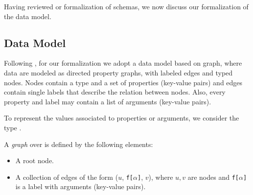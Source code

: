 
Having reviewed or formalization of schemas, we now discuss our formalization of the data model. 

\subsection{Data Model}\label{subsec:graph}
Following \HP, for our formalization we adopt a data model based on graph, where data are modeled as directed property graphs, with labeled edges and typed nodes. Nodes contain a type and a set of properties (key-value pairs) and  edges contain single labels that describe the relation between nodes. Also, every property and label may contain a list of arguments (key-value pairs).

To represent the values associated to properties or arguments, we consider the type \Vals. 

\begin{definition}
A \emph{\gql graph} over \Vals{} is defined by the following elements:
\begin{itemize}
    \item A root node.
    \item A collection of edges of the form ($u$, \texttt{f[}$\alpha$\texttt{]}, $v$), where $u, v$ are nodes and \texttt{f[}$\alpha$\texttt{]} is a label with arguments (key-value pairs).
\end{itemize}
\end{definition}

